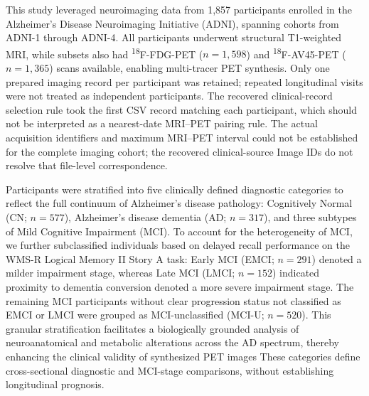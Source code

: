 \documentclass{article}
\providecommand{\DIFaddtex}[1]{{\protect\color{blue} \sf #1}} %
\providecommand{\DIFdeltex}[1]{{\protect\color{red} \scriptsize #1}} %
\providecommand{\DIFaddbegin}{} %
\providecommand{\DIFaddend}{} %
\providecommand{\DIFdelbegin}{} %
\providecommand{\DIFdelend}{} %
\providecommand{\DIFadd}[1]{\texorpdfstring{\DIFaddtex{#1}}{#1}} %
\providecommand{\DIFdel}[1]{\texorpdfstring{\DIFdeltex{#1}}{}} %
\newcommand{\DIFscaledelfig}{0.5}
\newlength{\DIFdelgraphicswidth} %
\newlength{\DIFdelgraphicsheight} %
\newcommand{\DIFaddincludegraphics}[2][]{{\color{blue}\fbox{\DIFOincludegraphics[#1]{#2}}}} %
\newcommand{\DIFdelincludegraphics}[2][]{%
\sbox{\DIFdelgraphicsbox}{\DIFOincludegraphics[#1]{#2}}%
\settoboxwidth{\DIFdelgraphicswidth}{\DIFdelgraphicsbox} %
\settoboxtotalheight{\DIFdelgraphicsheight}{\DIFdelgraphicsbox} %
\scalebox{\DIFscaledelfig}{%
\parbox[b]{\DIFdelgraphicswidth}{\usebox{\DIFdelgraphicsbox}\\[-\baselineskip] \rule{\DIFdelgraphicswidth}{0em}}\llap{\resizebox{\DIFdelgraphicswidth}{\DIFdelgraphicsheight}{%
\setlength{\unitlength}{\DIFdelgraphicswidth}%
\begin{picture}(1,1)%
\thicklines\linethickness{2pt} %
{\color[rgb]{1,0,0}\put(0,0){\framebox(1,1){}}}%
{\color[rgb]{1,0,0}\put(0,0){\line( 1,1){1}}}%
{\color[rgb]{1,0,0}\put(0,1){\line(1,-1){1}}}%
\end{picture}%
}\hspace*{3pt}}} %
} %
\DeclareRobustCommand{\DIFaddbegin}{\DIFOaddbegin \let\includegraphics\DIFaddincludegraphics} %
\DeclareRobustCommand{\DIFaddend}{\DIFOaddend \let\includegraphics\DIFOincludegraphics} %
\DeclareRobustCommand{\DIFdelbegin}{\DIFOdelbegin \let\includegraphics\DIFdelincludegraphics} %
\DeclareRobustCommand{\DIFdelend}{\DIFOaddend \let\includegraphics\DIFOincludegraphics} %
\begin{document}
This study leveraged neuroimaging data from 1,857 participants enrolled in the Alzheimer’s Disease Neuroimaging Initiative (ADNI), spanning cohorts from ADNI-1 through ADNI-4. All participants underwent structural T1-weighted MRI, while subsets also had \textsuperscript{18}F-FDG-PET ($n = 1,598$) and \textsuperscript{18}F-AV45-PET ($n = 1,365$) scans available, enabling multi-tracer PET synthesis. \DIFaddbegin \DIFadd{Only one prepared imaging record per participant was retained; repeated longitudinal visits were not treated as independent participants. The recovered clinical-record selection rule took the first CSV record matching each participant, which should not be interpreted as a nearest-date MRI--PET pairing rule. The actual acquisition identifiers and maximum MRI--PET interval could not be established for the complete imaging cohort; the recovered clinical-source Image IDs do not resolve that file-level correspondence.
}\DIFaddend 

Participants were stratified into five clinically defined diagnostic categories to reflect the full continuum of Alzheimer’s disease pathology: Cognitively Normal (CN; $n = 577$), Alzheimer’s disease dementia (AD; $n = 317$), and three subtypes of Mild Cognitive Impairment (MCI). To account for the heterogeneity of MCI, we further subclassified individuals based on delayed recall performance on the WMS-R Logical Memory II Story A task: Early MCI (EMCI; $n = 291$) denoted a milder impairment stage, whereas Late MCI (LMCI; $n = 152$) \DIFdelbegin \DIFdel{indicated proximity to dementia conversion}\DIFdelend \DIFaddbegin \DIFadd{denoted a more severe impairment stage}\DIFaddend . The remaining MCI participants \DIFdelbegin \DIFdel{without clear progression status }\DIFdelend \DIFaddbegin \DIFadd{not classified as EMCI or LMCI }\DIFaddend were grouped as MCI-unclassified (MCI-U; $n = 520$). \DIFdelbegin \DIFdel{This granular stratification facilitates a biologically grounded analysis of neuroanatomical and metabolic alterations across the AD spectrum, thereby enhancing the clinical validity of synthesized PET images}\DIFdelend \DIFaddbegin \DIFadd{These categories define cross-sectional diagnostic and MCI-stage comparisons, without establishing longitudinal prognosis}\DIFaddend .
\end{document}
